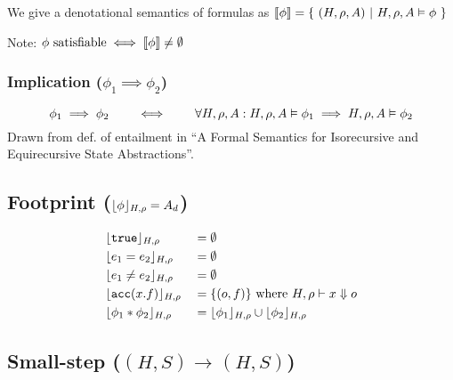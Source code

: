 \documentclass[11pt,a4paper]{article}
\begin{document}
We give a denotational semantics of formulas as $\valphi {\phi} = \{~ (H,\rho,A) ~|~ \evalphi {\phi} ~\}$

Note: $\phi \text{ satisfiable} \iff \valphi {\phi} \neq \emptyset$

\subsubsection{Implication ($\phi_1 \implies \phi_2$)}

\begin{equation*}
\phi_1 \implies \phi_2
\quad\quad \iff \quad\quad
\forall H, \rho, A: \evalphi \phi_1 \implies \evalphi \phi_2
\end{equation*}
Drawn from def. of entailment in ``A Formal Semantics for Isorecursive and Equirecursive State Abstractions''.

\subsection{Footprint ($\dynamicFP {H} {\rho} {\phi} = A_d$)}
\begin{align*}
 &\dynamicFP {H} {\rho} {\true}    		&&= \emptyset
\\ &\dynamicFP {H} {\rho} {e_1 = e_2}     	&&= \emptyset
\\ &\dynamicFP {H} {\rho} {e_1 \neq e_2}  	&&= \emptyset
\\ &\dynamicFP {H} {\rho} {\acc(x.f)} 		&&= \{(o,f)\} \text{ where } \evale x o
\\ &\dynamicFP {H} {\rho} {\phi_1 * \phi_2} &&= \dynamicFP {H} {\rho} {\phi_1} \cup \dynamicFP {H} {\rho} {\phi_2}
\end{align*}

\newcommand{\dType}[4]{#1, #2 \vdash #3 : #4}

\newcommand{\sstepGeneric}[5]{({#1}, {#2}) \rightarrow^{#3} ({#4}, {#5})}
\newcommand{\sstep}[4]{\sstepGeneric {#1} {#2} {} {#3} {#4}}
\newcommand{\sstepM}[4]{\sstepGeneric {#1} {#2} * {#3} {#4}} 
\newcommand{\sstepWS}[4]{\sstepGeneric {#1} {{#2} \cdot S} {} {#3} {{#4} \cdot S}}
\newcommand{\sstepWSX}[8]{\sstepGeneric {#1} {({#2},{#3},{#4}) \cdot S} {} {#5} {({#6},{#7},{#8}) \cdot S}}

\newcommand{\Tfs}{\overline{T}~\overline{f}}
\subsection{Small-step ($\sstep H S H S$)}

%
\end{document}
